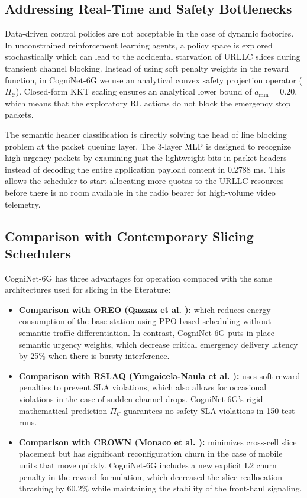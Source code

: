 \documentclass[twocolumn,10pt,twoside]{article}
\begin{document}
\subsection{Addressing Real-Time and Safety Bottlenecks}
Data-driven control policies are not acceptable in the case of dynamic factories. In unconstrained reinforcement learning agents, a policy space is explored stochastically which can lead to the accidental starvation of URLLC slices during transient channel blocking. Instead of using soft penalty weights in the reward function, in CogniNet-6G we use an analytical convex safety projection operator ($\Pi_{\mathcal{C}}$). Closed-form KKT scaling ensures an analytical lower bound of $a_{\min} = 0.20$, which means that the exploratory RL actions do not block the emergency stop packets.

The semantic header classification is directly solving the head of line blocking problem at the packet queuing layer. The 3-layer MLP is designed to recognize high-urgency packets by examining just the lightweight bits in packet headers instead of decoding the entire application payload content in 0.2788 ms. This allows the scheduler to start allocating more quotas to the URLLC resources before there is no room available in the radio bearer for high-volume video telemetry.

\subsection{Comparison with Contemporary Slicing Schedulers}
CogniNet-6G has three advantages for operation compared with the same architectures used for slicing in the literature:

\begin{itemize}
    \item \textbf{Comparison with OREO (Qazzaz et al. \cite{qazzaz2026oreo}):} which reduces energy consumption of the base station using PPO-based scheduling without semantic traffic differentiation. In contrast, CogniNet-6G puts in place semantic urgency weights, which decrease critical emergency delivery latency by 25\% when there is bursty interference.
    \item \textbf{Comparison with RSLAQ (Yungaicela-Naula et al. \cite{yungaicela2026rslaq}):} uses soft reward penalties to prevent SLA violations, which also allows for occasional violations in the case of sudden channel drops. CogniNet-6G's rigid mathematical prediction $\Pi_{\mathcal{C}}$ guarantees no safety SLA violations in 150 test runs.
    \item \textbf{Comparison with CROWN (Monaco et al. \cite{monaco2026crown}):} minimizes cross-cell slice placement but has significant reconfiguration churn in the case of mobile units that move quickly. CogniNet-6G includes a new explicit L2 churn penalty in the reward formulation, which decreased the slice reallocation thrashing by 60.2\% while maintaining the stability of the front-haul signaling.
\end{itemize}
\end{document}
